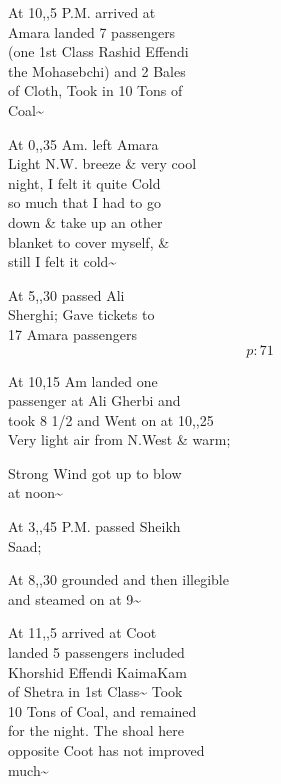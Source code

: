 \documentclass{report}
\begin{document}
	\par{
 	At 10,,5 P.M. arrived at\ \\Amara landed 7 passengers\ \\(one 1st Class Rashid Effendi\ \\the Mohasebchi) and 2 Bales\ \\of Cloth, Took in 10 Tons of\ \\Coal\~{}\ \\
	}

	\par{
 	At 0,,35 Am. left Amara\ \\Light N.W. breeze \& very cool\ \\night, I felt it quite Cold\ \\so much that I had to go\ \\down \& take up an other\ \\blanket to cover myself, \&\ \\still I felt it cold\~{}\ \\
	}

	\par{
 	At 5,,30 passed Ali\ \\Sherghi; Gave tickets to\ \\17 Amara passengers\ \\
  \[p: 71 \]

	}


	\par{
 	At 10,15 Am landed one\ \\passenger at Ali Gherbi and\ \\took 8 1/2 and Went on at 10,,25\ \\Very light air from N.West \& warm;\ \\
	}

	\par{
 	Strong Wind got up to blow\ \\at noon\~{}\ \\
	}

	\par{
 	At 3,,45 P.M. passed Sheikh\ \\Saad;\ \\
	}

	\par{
 	At 8,,30 grounded and then \lbrack illegible\rbrack\ \\and steamed on at 9\~{}\ \\
	}

	\par{
 	At 11,,5 arrived at Coot\ \\landed 5 passengers included\ \\Khorshid Effendi KaimaKam\ \\of Shetra in 1st Class\~{} Took\ \\10 Tons of Coal, and remained\ \\for the night. The shoal here\ \\opposite Coot has not improved\ \\much\~{}\ \\
	}
\end{document}
